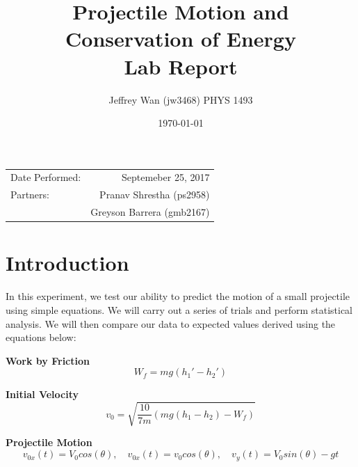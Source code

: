 \documentclass{article}
\title{Projectile Motion and Conservation of Energy \\Lab Report} %
\author{Jeffrey Wan (jw3468) PHYS 1493} %
\date{\today} %
\begin{document}
\maketitle %

\begin{center}
\begin{tabular}{l r}
Date Performed: & Septemeber 25, 2017 \\ %
    Partners: & Pranav Shrestha (ps2958)\\ %
    & Greyson Barrera (gmb2167)\\
\end{tabular}
\end{center}



\section{Introduction}

In this experiment, we test our ability to predict the motion of a small projectile using simple equations. We will carry out a series of trials and perform statistical analysis. We will then compare our data to expected values derived using the equations below: 

\hspace{1cm}

\textbf{Work by Friction}
\begin{equation} \label{eq:1}
    W_{f} = mg(h_{1}\ensuremath{'} - h_{2}\ensuremath{'})
\end{equation}

\textbf{Initial Velocity}
\begin{equation} \label{eq:2}
    v_{0} = \sqrt{\frac{10}{7m}(mg(h_{1}-h_{2})-W_{f})}
\end{equation}

\textbf{Projectile Motion}
\begin{equation} \label{eq:3}
    v_{0x}(t) = V_{0} cos(\theta), \quad v_{0x}(t) = v_{0} cos(\theta), \quad v_{y}(t) = V_{0} sin(\theta) - gt
\end{equation}
\end{document}
